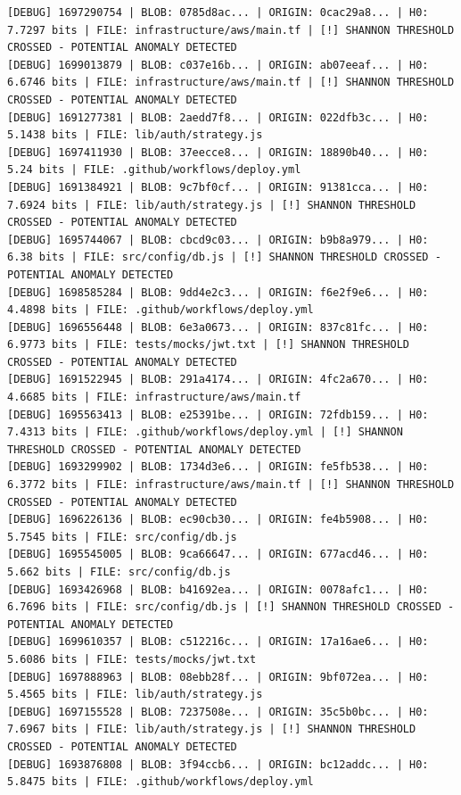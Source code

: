 \documentclass[12pt, a4paper, oneside]{report}
\begin{document}
\begin{lstlisting}[basicstyle=\tiny\ttfamily]
[DEBUG] 1697290754 | BLOB: 0785d8ac... | ORIGIN: 0cac29a8... | H0: 7.7297 bits | FILE: infrastructure/aws/main.tf | [!] SHANNON THRESHOLD CROSSED - POTENTIAL ANOMALY DETECTED
[DEBUG] 1699013879 | BLOB: c037e16b... | ORIGIN: ab07eeaf... | H0: 6.6746 bits | FILE: infrastructure/aws/main.tf | [!] SHANNON THRESHOLD CROSSED - POTENTIAL ANOMALY DETECTED
[DEBUG] 1691277381 | BLOB: 2aedd7f8... | ORIGIN: 022dfb3c... | H0: 5.1438 bits | FILE: lib/auth/strategy.js
[DEBUG] 1697411930 | BLOB: 37eecce8... | ORIGIN: 18890b40... | H0: 5.24 bits | FILE: .github/workflows/deploy.yml
[DEBUG] 1691384921 | BLOB: 9c7bf0cf... | ORIGIN: 91381cca... | H0: 7.6924 bits | FILE: lib/auth/strategy.js | [!] SHANNON THRESHOLD CROSSED - POTENTIAL ANOMALY DETECTED
[DEBUG] 1695744067 | BLOB: cbcd9c03... | ORIGIN: b9b8a979... | H0: 6.38 bits | FILE: src/config/db.js | [!] SHANNON THRESHOLD CROSSED - POTENTIAL ANOMALY DETECTED
[DEBUG] 1698585284 | BLOB: 9dd4e2c3... | ORIGIN: f6e2f9e6... | H0: 4.4898 bits | FILE: .github/workflows/deploy.yml
[DEBUG] 1696556448 | BLOB: 6e3a0673... | ORIGIN: 837c81fc... | H0: 6.9773 bits | FILE: tests/mocks/jwt.txt | [!] SHANNON THRESHOLD CROSSED - POTENTIAL ANOMALY DETECTED
[DEBUG] 1691522945 | BLOB: 291a4174... | ORIGIN: 4fc2a670... | H0: 4.6685 bits | FILE: infrastructure/aws/main.tf
[DEBUG] 1695563413 | BLOB: e25391be... | ORIGIN: 72fdb159... | H0: 7.4313 bits | FILE: .github/workflows/deploy.yml | [!] SHANNON THRESHOLD CROSSED - POTENTIAL ANOMALY DETECTED
[DEBUG] 1693299902 | BLOB: 1734d3e6... | ORIGIN: fe5fb538... | H0: 6.3772 bits | FILE: infrastructure/aws/main.tf | [!] SHANNON THRESHOLD CROSSED - POTENTIAL ANOMALY DETECTED
[DEBUG] 1696226136 | BLOB: ec90cb30... | ORIGIN: fe4b5908... | H0: 5.7545 bits | FILE: src/config/db.js
[DEBUG] 1695545005 | BLOB: 9ca66647... | ORIGIN: 677acd46... | H0: 5.662 bits | FILE: src/config/db.js
[DEBUG] 1693426968 | BLOB: b41692ea... | ORIGIN: 0078afc1... | H0: 6.7696 bits | FILE: src/config/db.js | [!] SHANNON THRESHOLD CROSSED - POTENTIAL ANOMALY DETECTED
[DEBUG] 1699610357 | BLOB: c512216c... | ORIGIN: 17a16ae6... | H0: 5.6086 bits | FILE: tests/mocks/jwt.txt
[DEBUG] 1697888963 | BLOB: 08ebb28f... | ORIGIN: 9bf072ea... | H0: 5.4565 bits | FILE: lib/auth/strategy.js
[DEBUG] 1697155528 | BLOB: 7237508e... | ORIGIN: 35c5b0bc... | H0: 7.6967 bits | FILE: lib/auth/strategy.js | [!] SHANNON THRESHOLD CROSSED - POTENTIAL ANOMALY DETECTED
[DEBUG] 1693876808 | BLOB: 3f94ccb6... | ORIGIN: bc12addc... | H0: 5.8475 bits | FILE: .github/workflows/deploy.yml

\end{lstlisting}
\end{document}
